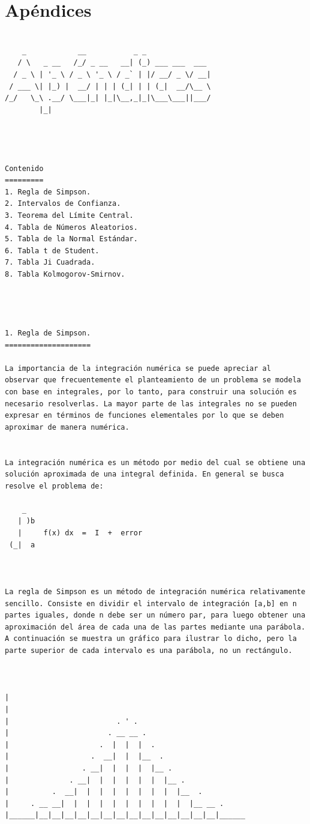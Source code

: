 \chapter{Apéndices}
\begin{verbatim}

    _            __           _ _
   / \   _ __   /_/ _ __   __| (_) ___ ___  ___
  / _ \ | '_ \ / _ \ '_ \ / _` | |/ __/ _ \/ __|
 / ___ \| |_) |  __/ | | | (_| | | (_|  __/\__ \
/_/   \_\ .__/ \___|_| |_|\__,_|_|\___\___||___/
        |_|




Contenido
=========
1. Regla de Simpson.
2. Intervalos de Confianza.
3. Teorema del Límite Central.
4. Tabla de Números Aleatorios.
5. Tabla de la Normal Estándar.
6. Tabla t de Student.
7. Tabla Ji Cuadrada.
8. Tabla Kolmogorov-Smirnov.


 

1. Regla de Simpson.
====================

La importancia de la integración numérica se puede apreciar al observar que frecuentemente el planteamiento de un problema se modela con base en integrales, por lo tanto, para construir una solución es necesario resolverlas. La mayor parte de las integrales no se pueden expresar en términos de funciones elementales por lo que se deben aproximar de manera numérica. 


La integración numérica es un método por medio del cual se obtiene una solución aproximada de una integral definida. En general se busca resolve el problema de:

    _ 
   | )b
   |     f(x) dx  =  I  +  error
 (_|  a



La regla de Simpson es un método de integración numérica relativamente sencillo. Consiste en dividir el intervalo de integración [a,b] en n partes iguales, donde n debe ser un número par, para luego obtener una aproximación del área de cada una de las partes mediante una parábola. A continuación se muestra un gráfico para ilustrar lo dicho, pero la parte superior de cada intervalo es una parábola, no un rectángulo.



|
|                           
|                         . ' .
|                       . __ __ .
|                     .  |  |  |  .
|                   .  __|  |  |__  .
|                 . __|  |  |  |  |__ .
|              . __|  |  |  |  |  |  |__ .
|          .  __|  |  |  |  |  |  |  |  |__  .
|     . __ __|  |  |  |  |  |  |  |  |  |  |__ __ .
|______|__|__|__|__|__|__|__|__|__|__|__|__|__|__|______




\end{verbatim}
